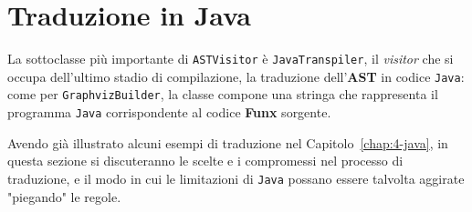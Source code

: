 \section{Traduzione in Java}
\label{sec:5-10-java-translation}

La sottoclasse più importante di \texttt{ASTVisitor} è \texttt{JavaTranspiler}, il \textit{visitor} che si occupa
dell'ultimo stadio di compilazione, la traduzione dell'\textbf{AST} in codice \texttt{Java}:
come per \texttt{GraphvizBuilder}, la classe compone una stringa
che rappresenta il programma \texttt{Java} corrispondente al codice \textbf{Funx} sorgente.


Avendo già illustrato alcuni esempi di traduzione nel Capitolo~\ref{chap:4-java}, in questa sezione si
discuteranno le scelte e i compromessi nel processo di traduzione, e il modo in cui le limitazioni
di \texttt{Java} possano essere talvolta aggirate "piegando" le regole.



\newpage







\newpage


